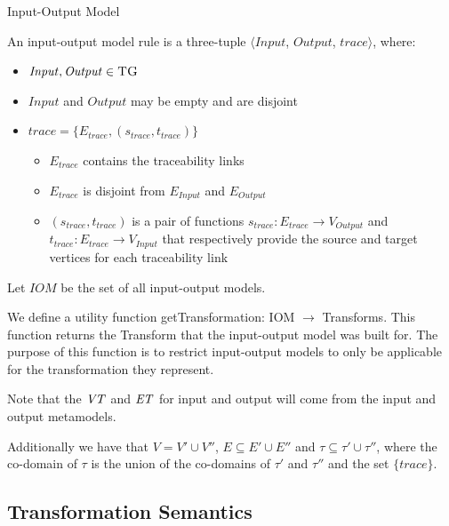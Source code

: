 \begin{definition}{Input-Output Model\\}
\label{def:input_output_model}

An input-output model rule is a three-tuple $\big\langle \mathit{Input}$, $\mathit{Output}$, $\mathit{trace}\big\rangle$, where:

\begin{itemize}
\item $\mathit{Input}, \mathit{Output} \in \textsc{TG}$
\item $\mathit{Input}$ and $\mathit{Output} $ may be empty and are disjoint
\item $\mathit{trace} = \{E_{trace}, (s_{trace}, t_{trace})\}$
\begin{itemize}
\item $E_{trace}$ contains the traceability links
\item $E_{trace} $ is disjoint from $E_{Input}$ and $E_{Output}$
\item $(s_{trace}, t_{trace})$ is a pair of functions $s_{trace}: E_{trace}\rightarrow V_{\textit{Output}}$ and $t_{trace}: E_{trace}\rightarrow V_{\textit{Input}}$ that respectively provide the source and target vertices for each traceability link
\end{itemize}

\end{itemize}  

Let $\mathit{IOM}$ be the set of all input-output models.

We define a utility function getTransformation: IOM $\rightarrow$ Transforms. This function returns the Transform that the input-output model was built for. The purpose of this function is to restrict input-output models to only be applicable for the transformation they represent.

Note that the $\mathit{VT}$ and $\mathit{ET}$ for input and output will come from the input and output metamodels.  

Additionally we have that $V=V'\cup V''$, $E\subseteq E'\cup E''$ and $\tau\subseteq \tau'\cup \tau''$, where the co-domain of $\tau$ is the union of the co-domains of $\tau'$ and $\tau''$ and the set $\{trace\}$.

\end{definition}


\subsection{Transformation Semantics}
\label{sec:DSLTrans_semantics}

